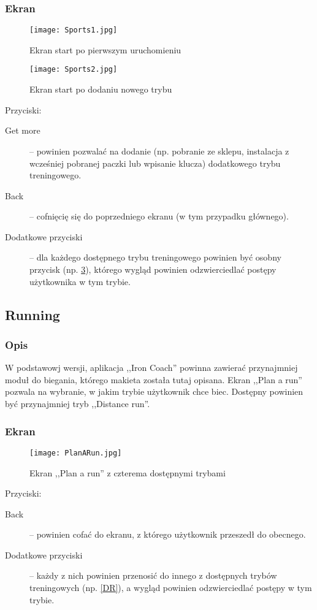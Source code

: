 \subsubsection{Ekran}
\begin{figure}[b!]
  \texttt{[image: Sports1.jpg]}
  \caption{Ekran start po pierwszym uruchomieniu}
  \label{S1}
\end{figure}
\begin{figure}[b!]
  \texttt{[image: Sports2.jpg]}
  \caption{Ekran start po dodaniu nowego trybu}
  \label{S2}
\end{figure}
Przyciski:\\
\begin{description}
  \item[Get more] -- powinien pozwalać na dodanie (np. pobranie ze sklepu, instalacja z wcześniej pobranej paczki lub wpisanie klucza) dodatkowego trybu treningowego.
  \item[Back] -- cofnięcię się do poprzedniego ekranu (w tym przypadku głównego).
  \item[Dodatkowe przyciski] -- dla każdego dostępnego trybu treningowego powinien być osobny przycisk (np. \ref{PR}), którego wygląd powinien odzwierciedlać postępy użytkownika w tym trybie.
\end{description}
\subsection{Running}
\subsubsection{Opis}
\noindent W podstawowj wersji, aplikacja ,,Iron Coach'' powinna zawierać przynajmniej moduł do biegania, którego makieta została tutaj opisana. Ekran ,,Plan a run'' pozwala na wybranie, w jakim trybie użytkownik chce biec. Dostępny powinien być przynajmniej tryb ,,Distance run''.
\subsubsection{Ekran}
\begin{figure}[b!]
  \texttt{[image: PlanARun.jpg]}
  \caption{Ekran ,,Plan a run'' z czterema dostępnymi trybami}
  \label{PR}
\end{figure}
Przyciski:\\
\begin{description}
  \item[Back] -- powinien cofać do ekranu, z którego użytkownik przeszedł do obecnego.
  \item[Dodatkowe przyciski] -- każdy z nich powinien przenosić do innego z dostępnych trybów treningowych (np. \ref{DR}), a wygląd powinien odzwierciedlać postępy w tym trybie.
\end{description}
